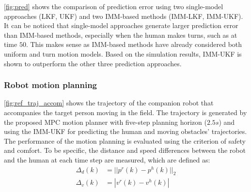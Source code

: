 \documentclass[letterpaper, 10 pt, conference]{ieeeconf}
\begin{document}
	\cref{fig:pred} shows the comparison of prediction error using two single-model approaches (LKF, UKF) and two IMM-based methods (IMM-LKF, IMM-UKF).
	It can be noticed that single-model approaches generate larger prediction error than IMM-based methods, especially when the human makes turns,  such as at time $50$.
	This makes sense as IMM-based methods have already considered both uniform and turn motion models.
	Based on the simulation results, IMM-UKF is shown to outperform the other three prediction approaches.
	
	\subsubsection{Robot motion planning}\label{subsubsec:motion_plan}
	\cref{fig:ref_traj_accom} shows the trajectory of the companion robot that accompanies the target person moving in the field. The trajectory is generated by the proposed MPC motion planner with five-step planning horizon ($2.5s$) and using the IMM-UKF for predicting the human and moving obstacles' trajectories.
	The performance of the motion planning is evaluated using the criterion of safety and comfort.
	To be specific, the distance and speed differences between the robot and the human at each time step are measured, which are defined as:
	\small	\begin{subequations}
		\begin{align}
			\Delta_d(k)&=||p^r(k)-p^h(k)||_2\label{eqn:err_d}\\
			\Delta_v(k)&=|v^r(k)-v^h(k)|\label{eqn:err_v}
		\end{align}
	\end{subequations}
	\normalsize
	
\end{document}
